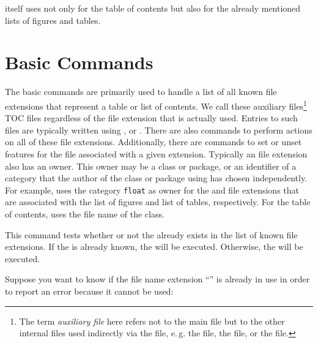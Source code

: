 \KOMAScript{} itself uses  not only for the table of
contents but also for the already mentioned lists of figures and tables.

\section{Basic Commands}
\label{sec:tocbasic.basics}

The basic commands are primarily used to handle a list of all known file
extensions that represent a table or
list of contents. We call these auxiliary files\footnote{The term \emph{auxiliary file} here refers not to the main
   file but to the other internal files used indirectly via the
   file, e.\,g. the  file, the  file, or the
   file.} TOC files
regardless of the file extension that is actually used. Entries to such files
are typically written using
, or
. There are also commands to perform
actions on all of these file extensions. Additionally, there are commands to
set or unset features for the file associated with a given extension.
Typically an file extension also has an owner. This owner
may be a class or package, or an identifier of a category that the author of
the class or package using  has chosen independently. For
example, \KOMAScript{} uses the category \texttt{float} as owner for the
 and  file extensions that are associated with the list of
figures and list of tables, respectively. For the table of contents,
\KOMAScript{} uses the file name of the class.

\begin{Declaration}
\end{Declaration}
This command tests whether or not the
 already exists in the list of known file extensions. If the
 is already known, the  will be
executed. Otherwise, the  will be executed.
\begin{Example}
  Suppose you want to know if the file name extension ``'' is
  already in use in order to report an error because it cannot be used:
\begin{lstcode}
\end{lstcode}
\end{Example}
\EndIndexGroup



